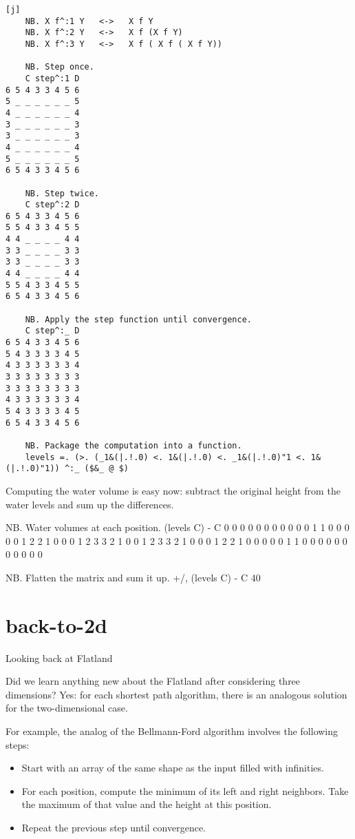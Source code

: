\documentclass{article}
\begin{document}
\begin{verbatim}[j]
    NB. X f^:1 Y   <->   X f Y
    NB. X f^:2 Y   <->   X f (X f Y)
    NB. X f^:3 Y   <->   X f ( X f ( X f Y))

    NB. Step once.
    C step^:1 D
6 5 4 3 3 4 5 6
5 _ _ _ _ _ _ 5
4 _ _ _ _ _ _ 4
3 _ _ _ _ _ _ 3
3 _ _ _ _ _ _ 3
4 _ _ _ _ _ _ 4
5 _ _ _ _ _ _ 5
6 5 4 3 3 4 5 6

    NB. Step twice.
    C step^:2 D
6 5 4 3 3 4 5 6
5 5 4 3 3 4 5 5
4 4 _ _ _ _ 4 4
3 3 _ _ _ _ 3 3
3 3 _ _ _ _ 3 3
4 4 _ _ _ _ 4 4
5 5 4 3 3 4 5 5
6 5 4 3 3 4 5 6

    NB. Apply the step function until convergence.
    C step^:_ D
6 5 4 3 3 4 5 6
5 4 3 3 3 3 4 5
4 3 3 3 3 3 3 4
3 3 3 3 3 3 3 3
3 3 3 3 3 3 3 3
4 3 3 3 3 3 3 4
5 4 3 3 3 3 4 5
6 5 4 3 3 4 5 6

    NB. Package the computation into a function.
    levels =. (>. (_1&(|.!.0) <. 1&(|.!.0) <. _1&(|.!.0)"1 <. 1&(|.!.0)"1)) ^:_ ($&_ @ $)
\end{verbatim}

Computing the water volume is easy now: subtract the original height from the water levels and sum up the differences.

\begin{code}[j]
    NB. Water volumes at each position.
    (levels C) - C
0 0 0 0 0 0 0 0
0 0 0 1 1 0 0 0
0 0 1 2 2 1 0 0
0 1 2 3 3 2 1 0
0 1 2 3 3 2 1 0
0 0 1 2 2 1 0 0
0 0 0 1 1 0 0 0
0 0 0 0 0 0 0 0

    NB. Flatten the matrix and sum it up.
    +/, (levels C) - C
40
\end{code}

\section{back-to-2d}{Looking back at Flatland}

Did we learn anything new about the Flatland after considering three dimensions?
Yes: for each shortest path algorithm, there is an analogous solution for the two-dimensional case.

For example, the analog of the Bellmann-Ford algorithm involves the following steps:
\begin{itemize}
  \item Start with an array of the same shape as the input filled with infinities.
  \item 
    For each position, compute the minimum of its left and right neighbors.
    Take the maximum of that value and the height at this position.
  \item Repeat the previous step until convergence.
\end{itemize}
\end{document}
